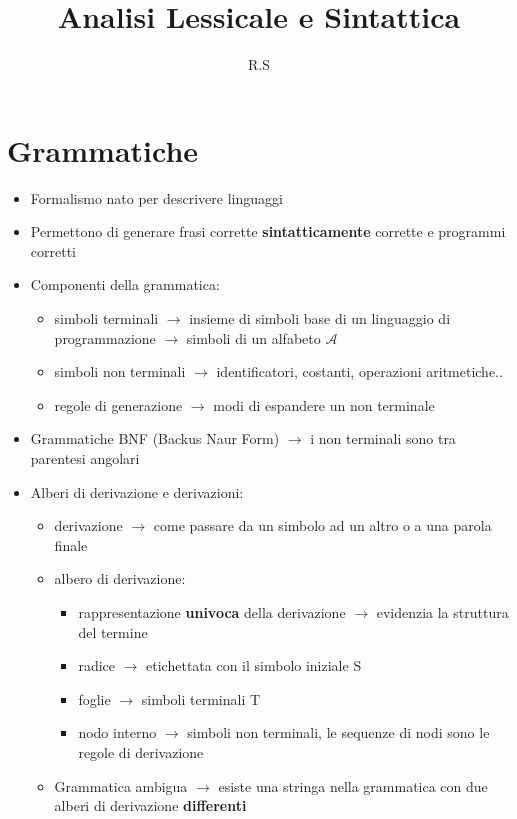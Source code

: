 \documentclass{article}
\title{Analisi Lessicale e Sintattica}
\author{R.S}
\begin{document}
\maketitle

\section*{Grammatiche}

\begin{itemize}
  \item Formalismo nato per descrivere linguaggi
  \item Permettono di generare frasi corrette \textbf{sintatticamente} corrette e programmi corretti
  \item Componenti della grammatica:
  \begin{itemize}
    \item simboli terminali $\rightarrow$ insieme di simboli base di un linguaggio di programmazione $\rightarrow$ simboli di un alfabeto $\mathcal{A}$ 
    \item simboli non terminali $\rightarrow$ identificatori, costanti, operazioni aritmetiche..
    \item regole di generazione $\rightarrow$ modi di espandere un non terminale
  \end{itemize}
  \item Grammatiche BNF (Backus Naur Form) $\rightarrow$ i non terminali sono tra parentesi angolari
  \item Alberi di derivazione e derivazioni:
  \begin{itemize}
    \item derivazione $\rightarrow$ come passare da un simbolo ad un altro o a una parola finale
    \item albero di derivazione:
    \begin{itemize}
      \item rappresentazione \textbf{univoca} della derivazione $\rightarrow$ evidenzia la struttura del termine
      \item radice $\rightarrow$ etichettata con il simbolo iniziale S
      \item foglie $\rightarrow$ simboli terminali T
      \item nodo interno $\rightarrow$ simboli non terminali, le sequenze di nodi sono le regole di derivazione 
    \end{itemize}
  \item Grammatica ambigua $\rightarrow$ esiste una stringa nella grammatica con due alberi di derivazione \textbf{differenti}

\end{itemize}
\end{itemize}
\end{document}

